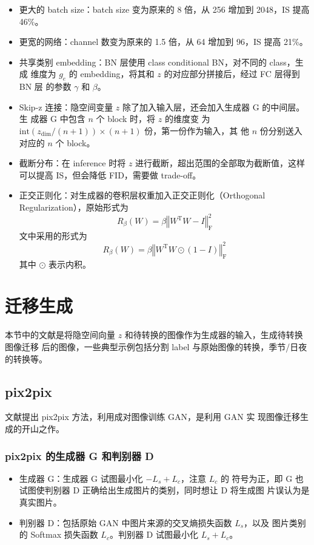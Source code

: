 \begin{itemize}
  \item 更大的 batch size：batch size 变为原来的 8 倍，从 256 增加到 2048，IS 提高 46\%。
  \item 更宽的网络：channel 数变为原来的 1.5 倍，从 64 增加到 96，IS 提高 21\%。
  \item 共享类别 embedding：BN 层使用 class conditional BN，对不同的 class，生成
    维度为 $g_e$ 的 embedding，将其和 $z$ 的对应部分拼接后，经过 FC 层得到 BN 层
    的参数 $\gamma$ 和 $\beta$。
  \item Skip-z 连接：隐空间变量 $z$ 除了加入输入层，还会加入生成器 G 的中间层。生
    成器 G 中包含 $n$ 个 block 时，将 $z$ 的维度变
    为 $\mathrm{int}({z}_{\mathrm{dim}} / (n+1)) \times (n+1)$ 份，第一份作为输入，其
    他 $n$ 份分别送入对应的 $n$ 个 block。
  \item 截断分布：在 inference 时将 $z$ 进行截断，超出范围的全部取为截断值，这样
    可以提高 IS，但会降低 FID，需要做 trade-off。
  \item 正交正则化：对生成器的卷积层权重加入正交正则化（Orthogonal
    Regularization），原始形式为
    \begin{equation}
      R_{\beta}(W) = \beta \left\Vert W^{\mathrm{T}}W-I\right\Vert _{\mathrm{F}}^2
    \end{equation}
    文中采用的形式为
    \begin{equation}
      R_{\beta}(W) = \beta \left\Vert W^{\mathrm{T}}W \odot (1-I)\right\Vert _{\mathrm{F}}^2
    \end{equation}
    其中 $\odot$ 表示内积。
\end{itemize}

\section{迁移生成}
本节中的文献是将隐空间向量 $z$ 和待转换的图像作为生成器的输入，生成待转换图像迁移
后的图像，一些典型示例包括分割 label 与原始图像的转换，季节/日夜的转换等。

\subsection{pix2pix}
文献提出 pix2pix 方法，利用成对图像训练 GAN，是利用 GAN 实
现图像迁移生成的开山之作。

\subsubsection{pix2pix 的生成器 G 和判别器 D}
\begin{itemize}
  \item 生成器 G：生成器 G 试图最小化 $-L_{s} + L_{c}$，注意 $L_{c}$ 的
    符号为正，即 G 也试图使判别器 D 正确给出生成图片的类别，同时想让 D 将生成图
    片误认为是真实图片。
  \item 判别器 D：包括原始 GAN 中图片来源的交叉熵损失函数 $L_{s}$，以及
    图片类别的 Softmax 损失函数 $L_{c}$。判别器 D 试图最小化 $L_{s} + L_{c}$。
\end{itemize}


